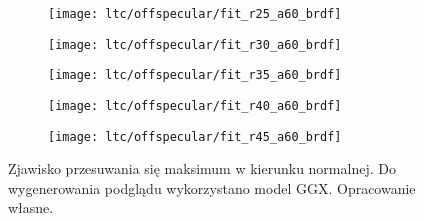 \documentclass[../main.tex]{subfiles}
\begin{document}
\begin{figure}
    \centering
    
    \begin{subfigure}[t]{0.18\textwidth}
        \texttt{[image: ltc/offspecular/fit\_r25\_a60\_brdf]}
    \end{subfigure}
    \begin{subfigure}[t]{0.18\textwidth}
        \texttt{[image: ltc/offspecular/fit\_r30\_a60\_brdf]}
    \end{subfigure}
    \begin{subfigure}[t]{0.18\textwidth}
        \texttt{[image: ltc/offspecular/fit\_r35\_a60\_brdf]}
    \end{subfigure}
    \begin{subfigure}[t]{0.18\textwidth}
        \texttt{[image: ltc/offspecular/fit\_r40\_a60\_brdf]}
    \end{subfigure}
    \begin{subfigure}[t]{0.18\textwidth}
        \texttt{[image: ltc/offspecular/fit\_r45\_a60\_brdf]}
    \end{subfigure}
    
    \caption{Zjawisko przesuwania się maksimum w kierunku normalnej. Do wygenerowania podglądu wykorzystano model GGX. Opracowanie własne.}
    \label{fig:BRDFOffSpecular}
\end{figure}
\end{document}
